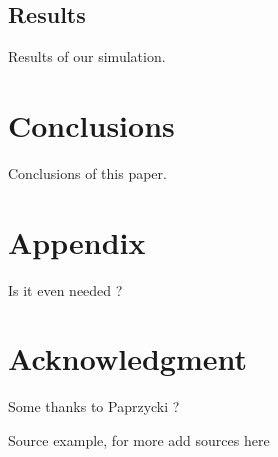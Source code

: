 \documentclass[conference]{IEEEtran}
\begin{document}
\subsection{Results}
Results of our simulation.








\section{Conclusions}
Conclusions of this paper.











\balance




\section*{Appendix}
Is it even needed ?

\section*{Acknowledgment}
Some thanks to Paprzycki ?


\begin{thebibliography}{99}

Source example, for more add sources here

\end{thebibliography}
\end{document}

